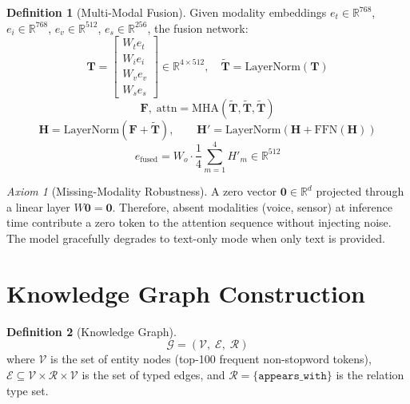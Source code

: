 \documentclass[12pt,a4paper]{article}
\theoremstyle{definition}
\newtheorem{definition}{Definition}[section]
\theoremstyle{plain}
\theoremstyle{remark}
\newtheorem{axiom}{Axiom}[section]
\newcommand{\R}{\mathbb{R}}
\newcommand{\KG}{\mathcal{G}}
\newcommand{\Ent}{\mathcal{E}}
\newcommand{\LN}{\mathrm{LayerNorm}}
\newcommand{\MHA}{\mathrm{MHA}}
\begin{document}
\begin{definition}[Multi-Modal Fusion]
Given modality embeddings $e_t \in \R^{768}$, $e_i \in \R^{768}$,
$e_v \in \R^{512}$, $e_s \in \R^{256}$, the fusion network:
\[
  \mathbf{T} = \begin{bmatrix}
    W_t e_t \\ W_i e_i \\ W_v e_v \\ W_s e_s
  \end{bmatrix} \in \R^{4 \times 512}, \quad
  \tilde{\mathbf{T}} = \LN(\mathbf{T})
\]
\[
  \mathbf{F},\; \text{attn} = \MHA(\tilde{\mathbf{T}}, \tilde{\mathbf{T}}, \tilde{\mathbf{T}})
\]
\[
  \mathbf{H} = \LN(\mathbf{F} + \tilde{\mathbf{T}}), \qquad
  \mathbf{H}' = \LN\!\left(\mathbf{H} + \mathrm{FFN}(\mathbf{H})\right)
\]
\[
  e_{\text{fused}} = W_o \cdot \frac{1}{4}\sum_{m=1}^{4} H'_m \in \R^{512}
\]
\end{definition}

\begin{axiom}[Missing-Modality Robustness]
A zero vector $\bm{0} \in \R^d$ projected through a linear layer $W\bm{0} = \bm{0}$.
Therefore, absent modalities (voice, sensor) at inference time contribute a zero token
to the attention sequence without injecting noise. The model gracefully degrades to
text-only mode when only text is provided.
\end{axiom}

\newpage
\section{Knowledge Graph Construction}

\begin{definition}[Knowledge Graph]
\[
  \KG = (\mathcal{V},\; \Ent,\; \mathcal{R})
\]
where $\mathcal{V}$ is the set of entity nodes (top-100 frequent non-stopword tokens),
$\Ent \subseteq \mathcal{V} \times \mathcal{R} \times \mathcal{V}$ is the set of typed edges,
and $\mathcal{R} = \{\texttt{appears\_with}\}$ is the relation type set.
\end{definition}
\end{document}
